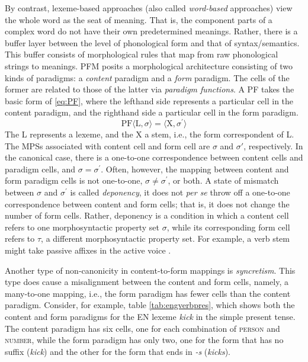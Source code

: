 By contrast, lexeme-based approaches (also called \emph{word-based} 
approaches) view the whole word as the seat of meaning. That is, the component 
parts of a complex word do not have their own predetermined meanings. 
Rather, 
there is a buffer layer between the level of phonological form and that of 
syntax/semantics. This
buffer consists of morphological rules that map from raw phonological 
strings to meanings.
\ac{PFM} \citep{stump:2001} 
posits a morphological architecture consisting of two kinds of paradigms: a \emph{content} paradigm and a \emph{form} paradigm.
The cells of the former are related to those of the latter via
\emph{paradigm functions}.
A \ac{PF} takes the basic form of
\eqref{eq:PF}, where the lefthand side represents a particular cell in the 
content paradigm, and the righthand side a particular cell in the form paradigm. 
\begin{equation}
\label{eq:PF}
	\text{PF}\langle \text{L},\sigma \rangle = \langle \text{X}, \sigma^\prime \rangle
\end{equation}
The L represents a lexeme, and the X a stem,  i.e., the form correspondent of L. 
The \ac{MPS}s associated with content cell and form cell are $\sigma$ and 
$\sigma\prime$, respectively. In the canonical case, there is a one-to-one
correspondence between content cells and paradigm cells, and 
$\sigma = \sigma^\prime$.
Often, however, the mapping between content and form paradigm cells is 
not one-to-one, $\sigma \ne \sigma^\prime$, or both. A state of mismatch 
between $\sigma$ and 
$\sigma^\prime$ is called \emph{deponency}, it does not \emph{per se} 
throw off a one-to-one correspondence between content and form cells; 
that is, it does not change the number of form cells. Rather, deponency 
is a condition in which a content cell refers to one morphosyntactic property 
set $\sigma$, while its corresponding form cell refers to $\tau$, a different 
morphosyntactic property set. For example, a verb stem might take passive 
affixes in the active voice \citep{stewart-and-stump:2007}.

Another type of non-canonicity in content-to-form mappings is \emph{syncretism}. 
This type does cause a misalignment between the content and form cells, namely,
a many-to-one mapping, i.e., the form paradigm has fewer cells 
than the content paradigm. Consider, for example, table 
\ref{tab:engverbpres}, which shows both the content and form paradigms 
for the \ac{EN} lexeme \emph{kick} in the simple present tense.
The content paradigm has six cells, one for each combination of \textsc{person} 
and \textsc{number}, while the form paradigm has only two, one for the 
form that has no suffix (\textit{kick}) and the other for the form 
that ends in \textit{-s} (\textit{kicks}). 
 
